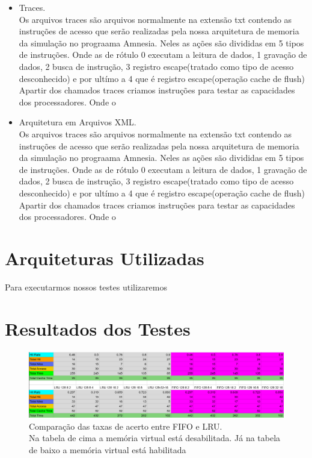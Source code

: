 \documentclass[conference]{IEEEtran}
\begin{document}
\begin{itemize}
\item Traces. \\
Os arquivos traces são  arquivos normalmente na extensão txt contendo as instruções de acesso que serão realizadas pela nossa arquitetura de memoria da simulação no prograama Amnesia. Neles as ações são divididas em 5 tipos de instruções. Onde as de rótulo 0 executam a leitura de dados, 1 gravação de dados, 2 busca de instrução, 3 registro escape(tratado como tipo de acesso desconhecido) e por ultímo a 4 que é registro escape(operação cache de flush)
Apartir dos chamados traces criamos instruções para testar as capacidades dos processadores. Onde o 
\
\\
\item Arquitetura em Arquivos XML. \\
Os arquivos traces são  arquivos normalmente na extensão txt contendo as instruções de acesso que serão realizadas pela nossa arquitetura de memoria da simulação no prograama Amnesia. Neles as ações são divididas em 5 tipos de instruções. Onde as de rótulo 0 executam a leitura de dados, 1 gravação de dados, 2 busca de instrução, 3 registro escape(tratado como tipo de acesso desconhecido) e por ultímo a 4 que é registro escape(operação cache de flush)
Apartir dos chamados traces criamos instruções para testar as capacidades dos processadores. Onde o 
\

\end{itemize}

\section{Arquiteturas Utilizadas}
\tem Para executarmos nossos testes utilizaremos

\section{Resultados dos Testes}

\begin{figure}
    \centering
    \includegraphics[width=\linewidth]{Imagens/Tabela.png}
    \caption{Comparação das taxas de acerto entre FIFO e LRU.\\Na tabela de cima a memória virtual está desabilitada. Já na tabela de baixo a memória virtual está habilitada}
    \label{fig:Comparação das taxas de acerto entre FIFO e LRU.\\Na tabela de cima a memória virtual está desabilitada. Já na tabela de baixo a memória virtual está habilitada}
\end{figure}
\end{document}
